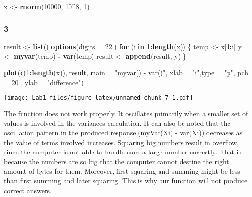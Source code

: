 \documentclass[
]{article}
\newenvironment{Shaded}{\begin{snugshade}}{\end{snugshade}}
\newcommand{\ControlFlowTok}[1]{\textcolor[rgb]{0.13,0.29,0.53}{\textbf{#1}}}
\newcommand{\DataTypeTok}[1]{\textcolor[rgb]{0.13,0.29,0.53}{#1}}
\newcommand{\DecValTok}[1]{\textcolor[rgb]{0.00,0.00,0.81}{#1}}
\newcommand{\KeywordTok}[1]{\textcolor[rgb]{0.13,0.29,0.53}{\textbf{#1}}}
\newcommand{\NormalTok}[1]{#1}
\newcommand{\OperatorTok}[1]{\textcolor[rgb]{0.81,0.36,0.00}{\textbf{#1}}}
\newcommand{\StringTok}[1]{\textcolor[rgb]{0.31,0.60,0.02}{#1}}
\begin{document}
\begin{Shaded}
\begin{Highlighting}[]
\NormalTok{x <-}\StringTok{ }\KeywordTok{rnorm}\NormalTok{(}\DecValTok{10000}\NormalTok{, }\DecValTok{10}\OperatorTok{^}\DecValTok{8}\NormalTok{, }\DecValTok{1}\NormalTok{)}
\end{Highlighting}
\end{Shaded}

\hypertarget{section-7}{%
\subsubsection{3}\label{section-7}}

\begin{Shaded}
\begin{Highlighting}[]
\NormalTok{result <-}\StringTok{ }\KeywordTok{list}\NormalTok{()}
\KeywordTok{options}\NormalTok{(}\DataTypeTok{digits =} \DecValTok{22}\NormalTok{ )}
\ControlFlowTok{for}\NormalTok{ (i }\ControlFlowTok{in} \DecValTok{1}\OperatorTok{:}\KeywordTok{length}\NormalTok{(x)) \{}
\NormalTok{  temp <-}\StringTok{ }\NormalTok{x[}\DecValTok{1}\OperatorTok{:}\NormalTok{i]}
\NormalTok{  y <-}\StringTok{ }\KeywordTok{myvar}\NormalTok{(temp) }\OperatorTok{-}\StringTok{ }\KeywordTok{var}\NormalTok{(temp)}
\NormalTok{  result <-}\StringTok{ }\KeywordTok{append}\NormalTok{(result, y)}
\NormalTok{\}}

\KeywordTok{plot}\NormalTok{(}\KeywordTok{c}\NormalTok{(}\DecValTok{1}\OperatorTok{:}\KeywordTok{length}\NormalTok{(x)), result, }\DataTypeTok{main =} \StringTok{"myvar() - var()"}\NormalTok{,}
     \DataTypeTok{xlab =} \StringTok{"i"}\NormalTok{,}\DataTypeTok{type =} \StringTok{"p"}\NormalTok{,  }\DataTypeTok{pch =} \DecValTok{20}\NormalTok{ , }\DataTypeTok{ylab =} \StringTok{"difference"}\NormalTok{)}
\end{Highlighting}
\end{Shaded}

\texttt{[image: Lab1\_files/figure-latex/unnamed-chunk-7-1.pdf]}

The function does not work properly. It oscillates primarily when a
smaller set of values is involved in the variances calculation. It can
also be noted that the oscillation pattern in the produced response
(myVar(Xi) - var(Xi)) decreases as the value of terms involved
increases. Squaring big numbers result in overflow, since the computer
is not able to handle such a large number correctly. That is because the
numbers are so big that the computer cannot destine the right amount of
bytes for them. Moreover, first squaring and summing might be less than
first summing and later squaring. This is why our function will not
produce correct answers.
\end{document}
